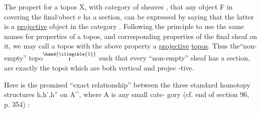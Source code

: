 
The propert  for a topos X, with category of sheaves , that
any object F in   covering the final`obect e  ha a section,
can be expressed by saying that the latter is a \uline{projective} object in
the category . Following the principle to use the same names for
properties of a topos, and corresponding properties of the final
sheaf on it, we may call a topos with the above property a \uline{projective}
\uline{topos}. Thus the``non-empty'' topo$\overset{\hand{\illegible{1}}}{\text{\i}}$ such that every ``non-empty'' sheaf 
has a section, are exactly the topo\"{\i} which are both vertical and projec%
-tive.

\begin{center}\shortstack{*\qquad *\\{}*}\end{center}

Here is the promised ``exact relationship'' between the three
standard homotopy structures h,h',h'' on A\^{}, where A is any small cate-%
gory (cf. end of section 96, p. 354) :

